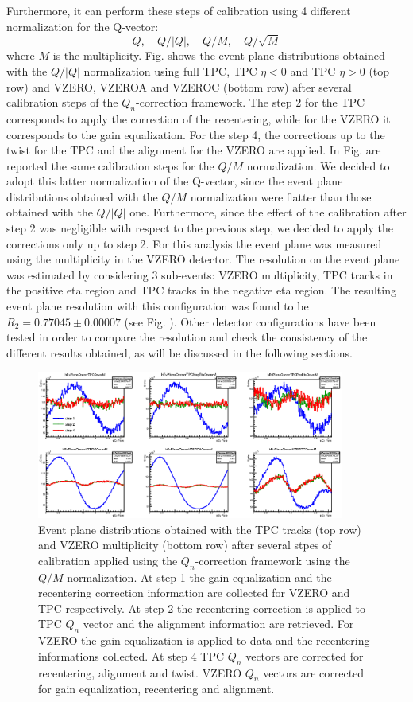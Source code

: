 Furthermore, it can perform these steps of calibration using 4 different normalization for the Q-vector:
\begin{equation}
Q, \quad Q/|Q|, \quad Q/M, \quad Q/\sqrt{M}
\end{equation}
where $M$ is the multiplicity.
Fig.  shows the event plane
distributions obtained with the $Q/|Q|$ normalization using full TPC, TPC $\eta<0$ and TPC $\eta>0$ (top row) and VZERO, VZEROA and VZEROC (bottom row) after several calibration steps of the $Q_n$-correction framework. The step 2 for the TPC  corresponds to apply the correction of the recentering, while for the VZERO it corresponds to the gain equalization. For the step 4, the corrections up to the twist for the TPC and the alignment for the VZERO are applied. In Fig. are reported the same calibration steps for the $Q/M$ normalization. We decided to adopt this latter normalization of the Q-vector, since the event plane distributions obtained with the $Q/M$ normalization were flatter than those obtained with the $Q/|Q|$ one. Furthermore, since the effect of the calibration after step 2 was negligible with respect to the previous step, we decided to apply the corrections only up to step 2.
For this analysis the event plane was measured using the multiplicity in the VZERO detector. The resolution on the event plane was estimated by considering 3 sub-events: VZERO multiplicity, TPC tracks in the positive eta region and TPC tracks in the negative eta region. The resulting event plane resolution with this configuration was found to be $R_2 = 0.77045 \pm 0.00007$ (see Fig. ). Other detector configurations have been tested in order to compare the resolution and check the consistency of the different results obtained, as will be discussed in the following sections.

\begin{figure}
\centering
 \includegraphics[width=0.9\textwidth]{FigCap5/EP_overMnorm.eps}
 \caption{Event plane distributions obtained with the TPC tracks (top row) and VZERO multiplicity (bottom row) after several stpes of calibration applied using the $Q_n$-correction framework using the $Q/M$ normalization. At step 1 the gain equalization and the
   recentering correction
   information are collected for VZERO and TPC respectively. At
   step 2 the recentering correction is applied to TPC $Q_n$ vector
   and the alignment information are retrieved. For VZERO the gain
   equalization is applied to data and the recentering informations
   collected. At step 4 TPC $Q_n$ vectors are corrected for
   recentering, alignment and twist. VZERO $Q_n$ vectors are corrected
   for gain equalization, recentering
   and alignment.}
   \label{fig:QoverMCalibration}
\end{figure}
